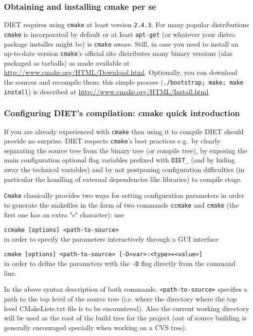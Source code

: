 \subsubsection{Obtaining and installing cmake per se}
DIET requires using \verb+cmake+ at least version \verb+2.4.3+.
For many popular distributions \verb+cmake+ is incorporated by
default or at least \verb+apt-get+ (or whatever your distro package installer
might be) is \verb+cmake+ aware.
Still, in case you need to install an up-to-date version \verb+cmake+'s
official site distributes many binary versions (alas packaged as tarballs)
as made available at 
\url{http://www.cmake.org/HTML/Download.html}.
Optionally, you can download the sources and recompile them: this simple
process (\verb+./bootstrap; make; make install+) is described at
\url{http://www.cmake.org/HTML/Install.html}.

\subsubsection{Configuring DIET's compilation: cmake quick introduction}
If you are already experienced with \verb+cmake+ then using it to compile
DIET should provide no surprise. 
DIET respects \verb+cmake+'s best practices e.g.~by clearly separating the
source tree from the binary tree (or compile tree), by exposing the main
configuration optional flag variables prefixed with \verb+DIET_+ (and by
hiding away the technical variables) and by not postponing configuration
difficulties (in particular the handling of external dependencies like
libraries) to compile stage.

\verb+Cmake+ classically provides two ways for setting configuration
parameters in order to generate the makefiles in the form of two
commands \verb+ccmake+ and \verb+cmake+ (the first one has an extra "c"
character): use
\begin{description}
\item{\verb+ccmake [options] <path-to-source>+}\\
  in order to specify the parameters interactively through a GUI interface
\item{\verb+cmake [options] <path-to-source> [-D<var>:<type>=<value>]+}\\
  in order to define the parameters with the \verb+-D+ flag directly
  from the command line.
\end{description}
In the above syntax description of both commands, {\verb+<path-to-source>+}
specifies a path to the top level of the source tree (i.e. where the directory
where the top level CMakeLists.txt file is to be encountered). Also
the current working directory will be used as the root of the build tree for
the project (out of source building is generally encouraged specially
when working on a CVS tree).

